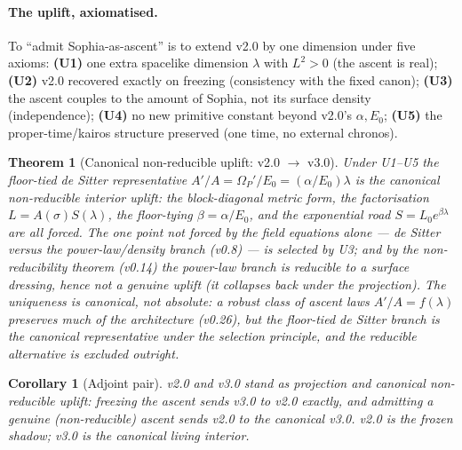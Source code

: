 \documentclass[11pt,a4paper]{article}
\theoremstyle{plain}
\newtheorem{corollary}{Corollary}
\newtheorem{theorem}{Theorem}
\theoremstyle{definition}
\theoremstyle{remark}
\begin{document}
\paragraph{The uplift, axiomatised.} To ``admit Sophia-as-ascent'' is to extend v2.0 by one dimension
under five axioms: \textbf{(U1)} one extra spacelike dimension $\lambda$ with $L^2>0$ (the ascent is
real); \textbf{(U2)} v2.0 recovered exactly on freezing (consistency with the fixed canon);
\textbf{(U3)} the ascent couples to the amount of Sophia, not its surface density (independence);
\textbf{(U4)} no new primitive constant beyond v2.0's $\alpha,E_0$; \textbf{(U5)} the proper-time/kairos
structure preserved (one time, no external chronos).

\begin{theorem}[Canonical non-reducible uplift: v2.0 $\to$ v3.0]
Under U1--U5 the floor-tied de Sitter representative $A'/A=\Omega_P'/E_0=(\alpha/E_0)\lambda$ is the
\emph{canonical} non-reducible interior uplift: the block-diagonal metric form, the factorisation
$L=A(\sigma)S(\lambda)$, the floor-tying $\beta=\alpha/E_0$, and the exponential road
$S=L_0e^{\beta\lambda}$ are all forced. The one point not forced by the field equations alone --- de
Sitter versus the power-law/density branch (v0.8) --- is selected by U3; and by the non-reducibility
theorem (v0.14) the power-law branch is reducible to a surface dressing, hence \emph{not a genuine
uplift} (it collapses back under the projection). The uniqueness is \emph{canonical}, not absolute: a
robust class of ascent laws $A'/A=f(\lambda)$ preserves much of the architecture (v0.26), but the
floor-tied de Sitter branch is the canonical representative under the selection principle, and the
\emph{reducible} alternative is excluded outright.
\end{theorem}

\begin{corollary}[Adjoint pair]
v2.0 and v3.0 stand as projection and canonical non-reducible uplift: freezing the ascent sends v3.0 to
v2.0 exactly, and admitting a genuine (non-reducible) ascent sends v2.0 to the canonical v3.0. v2.0 is
the frozen shadow; v3.0 is the canonical living interior.
\end{corollary}
\end{document}
